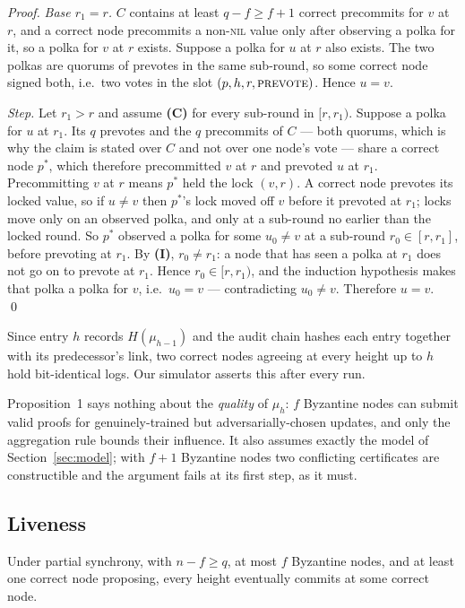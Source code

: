 \documentclass{llncs}
\begin{document}
\begin{proof}
\emph{Base $r_1 = r$.} $C$ contains at least $q - f \ge f+1$ correct precommits
for $v$ at $r$, and a correct node precommits a non-\textsc{nil} value only
after observing a polka for it, so a polka for $v$ at $r$ exists. Suppose a
polka for $u$ at $r$ also exists. The two polkas are quorums of prevotes in the
same sub-round, so some correct node signed both, i.e.\ two votes in the slot
$(p, h, r, \textsc{prevote})$. Hence $u = v$.

\emph{Step.} Let $r_1 > r$ and assume \textbf{(C)} for every sub-round in $[r,
r_1)$. Suppose a polka for $u$ at $r_1$. Its $q$ prevotes and the $q$ precommits
of $C$ --- both quorums, which is why the claim is stated over $C$ and not over
one node's vote --- share a correct node $p^*$, which therefore precommitted $v$ at $r$ and
prevoted $u$ at $r_1$. Precommitting $v$ at $r$ means $p^*$ held the lock $(v,
r)$. A correct node prevotes its locked value, so if $u \neq v$ then $p^*$'s lock
moved off $v$ before it prevoted at $r_1$; locks move only on an observed polka,
and only at a sub-round no earlier than the locked round. So $p^*$ observed a
polka for some $u_0 \neq v$ at a sub-round $r_0 \in [r, r_1]$, before prevoting
at $r_1$. By \textbf{(I)}, $r_0 \neq r_1$: a node that has seen a polka at $r_1$
does not go on to prevote at $r_1$. Hence $r_0 \in [r, r_1)$, and the induction
hypothesis makes that polka a polka for $v$, i.e.\ $u_0 = v$ --- contradicting
$u_0 \neq v$. Therefore $u = v$.
\qed
\end{proof}

Since entry $h$ records $H(\mu_{h-1})$ and the audit chain hashes each entry
together with its predecessor's link, two correct nodes agreeing at every height
up to $h$ hold bit-identical logs. Our simulator asserts this after every run.

Proposition~1 says nothing about the \emph{quality} of $\mu_h$: $f$ Byzantine
nodes can submit valid proofs for genuinely-trained but adversarially-chosen
updates, and only the aggregation rule bounds their influence. It also assumes
exactly the model of Section~\ref{sec:model}; with $f+1$ Byzantine nodes two
conflicting certificates are constructible and the argument fails at its first
step, as it must.

\subsection{Liveness}
\label{sec:liveness}

\begin{proposition}[Progress]
Under partial synchrony, with $n - f \ge q$, at most $f$ Byzantine nodes, and at
least one correct node proposing, every height eventually commits at some
correct node.
\end{proposition}
\end{document}
